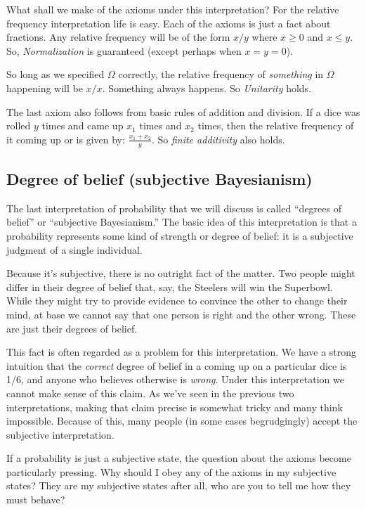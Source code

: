 What shall we make of the axioms under this interpretation?  For the relative frequency interpretation life is easy. Each of the axioms is just a fact about fractions.  Any relative frequency will be of the form $x/y$ where $x\geq 0$ and $x\leq y$.  So, {\it Normalization} is guaranteed (except perhaps when $x=y=0$).

So long as we specified $\Omega$ correctly, the relative frequency of {\it something} in $\Omega$ happening will be $x/x$.  Something always happens.  So {\it Unitarity} holds. 

The last axiom also follows from basic rules of addition and division.  If a dice was rolled $y$ times and came up  $x_1$ times and  $x_2$ times, then the relative frequency of it coming up  or  is given by: $\frac{x_1+x_2}{y}$. So {\it finite additivity} also holds.

\subsection{Degree of belief (subjective Bayesianism)}

The last interpretation of probability that we will discuss is called ``degrees of belief'' or ``subjective Bayesianism.''  The basic idea of this interpretation is that a probability represents some kind of strength or degree of belief: it is a subjective judgment of a single individual.

Because it's subjective, there is no outright fact of the matter.  Two people might differ in their degree of belief that, say, the Steelers will win the Superbowl.  While they might try to provide evidence to convince the other to change their mind, at base we cannot say that one person is right and the other wrong. These are just their degrees of belief.

This fact is often regarded as a problem for this interpretation.  We have a strong intuition that the {\it correct} degree of belief in a  coming up on a particular dice is 1/6, and anyone who believes otherwise is {\it wrong}.  Under this interpretation we cannot make sense of this claim.  As we've seen in the previous two interpretations, making that claim precise is somewhat tricky and many think impossible. Because of this, many people (in some cases begrudgingly) accept the subjective interpretation.  

If a probability is just a subjective state, the question about the axioms become particularly pressing.  Why should I obey any of the axioms in my subjective states?  They are my subjective states after all, who are you to tell me how they must behave?  

